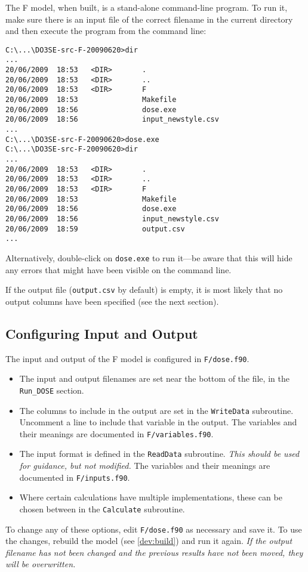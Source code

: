 
The F model, when built, is a stand-alone command-line program.  To run it, make sure there is an
input file of the correct filename in the current directory and then execute the program from the
command line:
\begin{lstlisting}
C:\...\DO3SE-src-F-20090620>dir
...
20/06/2009  18:53   <DIR>       .
20/06/2009  18:53   <DIR>       ..
20/06/2009  18:53   <DIR>       F
20/06/2009  18:53               Makefile
20/06/2009  18:56               dose.exe
20/06/2009  18:56               input_newstyle.csv
...
C:\...\DO3SE-src-F-20090620>dose.exe
C:\...\DO3SE-src-F-20090620>dir
...
20/06/2009  18:53   <DIR>       .
20/06/2009  18:53   <DIR>       ..
20/06/2009  18:53   <DIR>       F
20/06/2009  18:53               Makefile
20/06/2009  18:56               dose.exe
20/06/2009  18:56               input_newstyle.csv
20/06/2009  18:59               output.csv
...
\end{lstlisting}

Alternatively, double-click on \verb|dose.exe| to run it---be aware that this will hide any errors
that might have been visible on the command line.

If the output file (\verb|output.csv| by default) is empty, it is most likely that no output columns
have been specified (see the next section).

\subsection{Configuring Input and Output}

The input and output of the F model is configured in \verb|F/dose.f90|.

\begin{itemize}

\item The input and output filenames are set near the bottom of the file, in the \verb|Run_DOSE|
section.

\item The columns to include in the output are set in the \verb|WriteData| subroutine.  Uncomment a
line to include that variable in the output.  The variables and their meanings are documented in
\verb|F/variables.f90|.

\item The input format is defined in the \verb|ReadData| subroutine.  \emph{This should be used for
guidance, but not modified.}  The variables and their meanings are documented in
\verb|F/inputs.f90|.

\item Where certain calculations have multiple implementations, these can be chosen between in the
\verb|Calculate| subroutine.

\end{itemize}

To change any of these options, edit \verb|F/dose.f90| as necessary and save it.  To use the
changes, rebuild the model (see \ref{dev:build}) and run it again.  \emph{If the output filename has
not been changed and the previous results have not been moved, they will be overwritten.}
